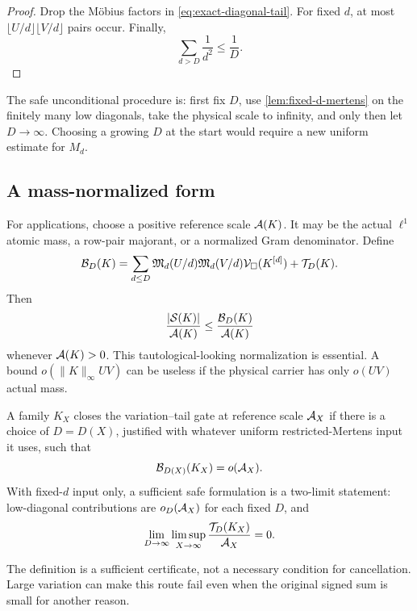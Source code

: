 \begin{proof}
Drop the M\"obius factors in \eqref{eq:exact-diagonal-tail}.  For fixed
\(d\), at most \(\lfloor U/d\rfloor\lfloor V/d\rfloor\) pairs occur.
Finally,
\[
 \sum_{d>D}\frac1{d^2}\le\frac1D.
\]
\end{proof}

\begin{remark}
The safe unconditional procedure is: first fix \(D\), use
\cref{lem:fixed-d-mertens} on the finitely many low diagonals, take the
physical scale to infinity, and only then let \(D\to\infty\).  Choosing a
growing \(D\) at the start would require a new uniform estimate for
\(M_d\).
\end{remark}

\subsection{A mass-normalized form}

For applications, choose a positive reference scale \(\mathcal A(K)\).  It may be
the actual \(\ell^1\) atomic mass, a row-pair majorant, or a normalized
Gram denominator.  Define
\begin{equation}
 \mathcal B_D(K)
 =
 \sum_{d\le D}
 \mathfrak M_d(U/d)\mathfrak M_d(V/d)
 \mathcal V_\square(K^{[d]})
 +\mathcal T_D(K).
\label{eq:certificate-numerator}
\end{equation}
Then
\begin{equation}
 \frac{|\mathcal S(K)|}{\mathcal A(K)}
 \le
 \frac{\mathcal B_D(K)}{\mathcal A(K)}
\label{eq:relative-certificate}
\end{equation}
whenever \(\mathcal A(K)>0\).  This tautological-looking normalization is
essential.  A bound \(o(\|K\|_\infty UV)\) can be useless if the physical
carrier has only \(o(UV)\) actual mass.

\begin{definition}
\label{def:variation-tail-gate}
A family \(K_X\) closes the variation--tail gate at reference scale
\(\mathcal A_X\) if there is a choice of \(D=D(X)\), justified with whatever
uniform restricted-Mertens input it uses, such that
\[
 \mathcal B_{D(X)}(K_X)=o(\mathcal A_X).
\]
With fixed-\(d\) input only, a sufficient safe formulation is a two-limit
statement: low-diagonal contributions are \(o_D(\mathcal A_X)\) for each fixed
\(D\), and
\[
 \lim_{D\to\infty}\limsup_{X\to\infty}
 \frac{\mathcal T_D(K_X)}{\mathcal A_X}=0.
\]
\end{definition}

\begin{remark}
The definition is a sufficient certificate, not a necessary condition for
cancellation.  Large variation can make this route fail even when the
original signed sum is small for another reason.
\end{remark}

